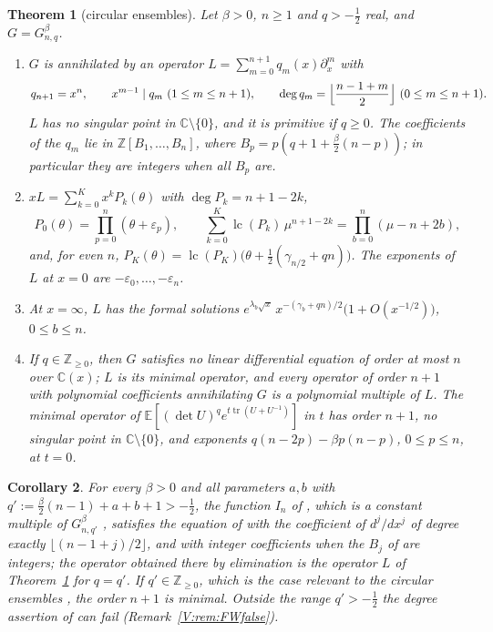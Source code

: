 \documentclass[11pt,a4paper]{article}
\newtheorem{theorem}{Theorem}[section]
\newtheorem{corollary}[theorem]{Corollary}
\theoremstyle{definition}
\theoremstyle{remark}
\newcommand{\C}{\mathbb C}
\newcommand{\Z}{\mathbb Z}
\newcommand{\E}{\mathbb E}
\newcommand{\fl}[1]{\lfloor #1\rfloor}
\DeclareMathOperator{\lc}{lc}
\DeclareMathOperator{\tr}{tr}
\numberwithin{equation}{section}
\begin{document}
\begin{theorem}[circular ensembles]\label{V:thm:A}
Let $\beta>0$, $n\ge1$ and $q>-\frac12$ real, and $G=G^\beta_{n,q}$.
\begin{enumerate}
\item[(a)] $G$ is annihilated by an operator $L=\sum_{m=0}^{n+1}q_m(x)\partial_x^m$ with
\[
q_{n+1}=x^n,\qquad x^{m-1}\mid q_m\ (1\le m\le n+1),\qquad\deg q_m=\Bigl\lfloor\frac{n-1+m}2\Bigr\rfloor\ (0\le m\le n+1).
\]
$L$ has no singular point in $\C\setminus\{0\}$, and it is primitive if $q\ge0$. The coefficients of the $q_m$ lie in $\Z[B_1,\dots,B_n]$, where $B_p=p(q+1+\frac\beta2(n-p))$; in particular they are integers when all $B_p$ are.
\item[(b)] $xL=\sum_{k=0}^{K}x^kP_k(\theta)$ with $\deg P_k=n+1-2k$,
\[
P_0(\theta)=\prod_{p=0}^{n}(\theta+\varepsilon_p),\qquad\sum_{k=0}^{K}\lc(P_k)\,\mu^{n+1-2k}=\prod_{b=0}^{n}(\mu-n+2b),
\]
and, for even $n$, $P_K(\theta)=\lc(P_K)\bigl(\theta+\frac12(\gamma_{n/2}+qn)\bigr)$. The exponents of $L$ at $x=0$ are $-\varepsilon_0,\dots,-\varepsilon_n$.
\item[(c)] At $x=\infty$, $L$ has the formal solutions $e^{\lambda_b\sqrt x}\,x^{-(\gamma_b+qn)/2}\bigl(1+O(x^{-1/2})\bigr)$, $0\le b\le n$.
\item[(d)] If $q\in\Z_{\ge0}$, then $G$ satisfies no linear differential equation of order at most $n$ over $\C(x)$; $L$ is its minimal operator, and every operator of order $n+1$ with polynomial coefficients annihilating $G$ is a polynomial multiple of $L$. The minimal operator of $\E[(\det U)^qe^{t\tr(U+U^{-1})}]$ in $t$ has order $n+1$, no singular point in $\C\setminus\{0\}$, and exponents $q(n-2p)-\beta p(n-p)$, $0\le p\le n$, at $t=0$.
\end{enumerate}
\end{theorem}

\begin{corollary}\label{V:cor:FW41}
For every $\beta>0$ and all parameters $a,b$ with $q':=\frac\beta2(n-1)+a+b+1>-\frac12$, the function $I_n$ of \cite[Prop.~3.3]{FW26}, which is a constant multiple of $G^\beta_{n,q'}$ \cite[(3.10)]{FW26}, satisfies the equation of \cite[Prop.~4.1]{FW26} with the coefficient of $d^j/dx^j$ of degree exactly $\fl{(n-1+j)/2}$, and with integer coefficients when the $B_j$ of \cite[(3.3)]{FW26} are integers; the operator obtained there by elimination is the operator $L$ of Theorem~\ref{V:thm:A} for $q=q'$. If $q'\in\Z_{\ge0}$, which is the case relevant to the circular ensembles \cite[(3.13), Remark~3.4]{FW26}, the order $n+1$ is minimal. Outside the range $q'>-\frac12$ the degree assertion of \cite[Prop.~4.1]{FW26} can fail (Remark~\ref{V:rem:FWfalse}).
\end{corollary}
\end{document}
